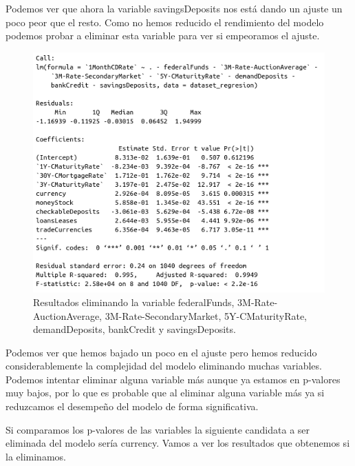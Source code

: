 \documentclass[12pt,a4paper]{article}
\begin{document}
Podemos ver que ahora la variable savingsDeposits nos está dando un ajuste un poco peor que el resto. Como no hemos reducido el rendimiento del modelo podemos probar a eliminar esta variable para ver si empeoramos el ajuste.

\begin{figure}[H]
	\centering 
	\includegraphics[scale=0.6]{./Imagenes/Regresion/regresion_multiple8.png}
	\caption{Resultados eliminando la variable federalFunds, 3M-Rate-AuctionAverage, 3M-Rate-SecondaryMarket, 5Y-CMaturityRate, demandDeposits, bankCredit y savingsDeposits.}
\end{figure}

Podemos ver que hemos bajado un poco en el ajuste pero hemos reducido considerablemente la complejidad del modelo eliminando muchas variables. Podemos intentar eliminar alguna variable más aunque ya estamos en p-valores muy bajos, por lo que es probable que al eliminar alguna variable más ya si reduzcamos el desempeño del modelo de forma significativa. 

Si comparamos los p-valores de las variables la siguiente candidata a ser eliminada del modelo sería currency. Vamos a ver los resultados que obtenemos si la eliminamos.
\end{document}

